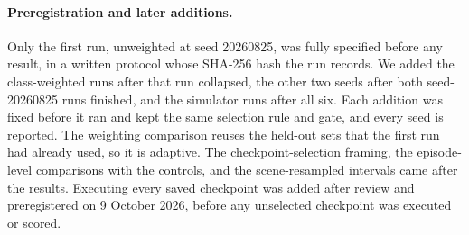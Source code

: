 \paragraph{Preregistration and later additions.}
Only the first run, unweighted at seed 20260825, was fully specified before any result, in a
written protocol whose SHA-256 hash the run records. We added the class-weighted runs after that
run collapsed, the other two seeds after both seed-20260825 runs finished, and the simulator runs
after all six. Each addition was fixed before it ran and kept the same selection rule and gate, and
every seed is reported. The weighting comparison reuses the held-out sets that the first run had
already used, so it is adaptive. The checkpoint-selection framing, the episode-level comparisons
with the controls, and the scene-resampled intervals came after the results. Executing every saved
checkpoint was added after review and preregistered on 9 October 2026, before any unselected
checkpoint was executed or scored.
